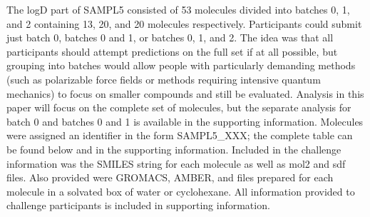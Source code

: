 The logD part of SAMPL5 consisted of 53 molecules divided into batches 0, 1, and 2 containing 13, 20, and 20 molecules respectively. 
Participants could submit just batch 0, batches 0 and 1, or batches 0, 1, and 2. 
The idea was that all participants should attempt predictions on the full set if at all possible, but grouping into batches would allow people with particularly demanding methods (such as polarizable force fields or methods requiring intensive quantum mechanics) to focus on smaller compounds and still be evaluated. 
Analysis in this paper will focus on the complete set of molecules, but the separate analysis for batch 0 and batches 0 and 1 is available in the supporting information. %
Molecules were assigned an identifier in the form SAMPL5\_XXX; the complete table can be found below and in the supporting information. 
Included in the challenge information was the SMILES string for each molecule as well as mol2 and sdf files. %
Also provided were GROMACS, AMBER, and %
files prepared for each molecule in a solvated box of water or cyclohexane. 
All information provided to challenge participants is included in supporting information. 

